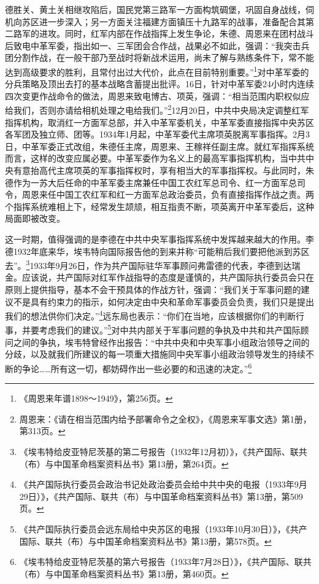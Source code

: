 德胜关、黄土关相继攻陷后，国民党第三路军一方面构筑碉堡，巩固自身战线，伺机向苏区进一步深入；另一方面关注福建方面镇压十九路军的战事，准备配合其第二路军的进攻。同时，红军内部在作战指挥上发生争论，朱德、周恩来在团村战斗后致电中革军委，指出如一、三军团会合作战，战果必不如此，强调：“我突击兵团分割作战，在一般干部乃至战时将新战术运用，尚未了解与熟练条件下，常不能达到高级要求的胜利，且常付出过大代价，此点在目前特别重要。”\footnote{《周恩来年谱1898～1949》，第256页。}对中革军委的分兵策略及顶出去打的基本战略含蓄提出批评。16日，针对中革军委24小时内连续四次变更作战命令的做法，周恩来致电博古、项英，强调：“相当范围内职权似应给我们，否则亦请给相机处理之电给我们。”\footnote{周恩来：《请在相当范围内给予部署命令之全权》，《周恩来军事文选》第1册，第313页。}12月20日，中共中央局决定调整红军指挥机构，取消红一方面军总部，并入中革军委机关，中革军委直接指挥中央苏区各军团及独立师、团等。1934年1月起，中革军委代主席项英脱离军事指挥。2月3日，中革军委正式改组，朱德任主席，周恩来、王稼祥任副主席。就红军指挥系统而言，这样的改变应属必要。中革军委作为名义上的最高军事指挥机构，当中共中央有意抬高代主席项英的军事指挥权时，享有相当大的军事指挥权。与此同时，朱德作为一苏大后任命的中革军委主席兼任中国工农红军总司令、红一方面军总司令，周恩来任中国工农红军和红一方面军总政治委员，负有直接指挥作战之责。两个指挥系统难相上下，经常发生颉颃，相互指责不断，项英离开中革军委后，这种局面即被改变。


这一时期，值得强调的是李德在中共中央军事指挥系统中发挥越来越大的作用。李德1932年底来华，埃韦特向国际报告他的到来并称“可能稍后我们要把他派到苏区去”。\footnote{《埃韦特给皮亚特尼茨基的第二号报告（1932年12月初）》，《共产国际、联共（布）与中国革命档案资料丛书》第13册，第264页。}1933年9月26日，作为共产国际驻华军事顾问弗雷德的代表，李德到达瑞金。应该说，共产国际对红军作战指导的态度是谨慎的，共产国际执行委员会只在原则上提供指导，基本不会干预具体的作战方针，强调：“我们关于军事问题的建议不是具有约束力的指示，如何决定由中央和革命军事委员会负责，我们只是提出我们的想法供你们决定。”\footnote{《共产国际执行委员会政治书记处政治委员会给中共中央的电报（1933年9月29日）》，《共产国际、联共（布）与中国革命档案资料丛书》第13册，第509页。}远东局也表示：“你们在当地，应该根据你们的判断行事，并要考虑我们的建议。”\footnote{《共产国际执行委员会远东局给中央苏区的电报（1933年10月30日）》，《共产国际、联共（布）与中国革命档案资料丛书》第13册，第578页。}对中共内部关于军事问题的争执及中共和共产国际顾问之间的争执，埃韦特曾经作出报告：“中共中央和中央军事小组政治领导之间的分歧，以及就我们所建议的每一项重大措施同中央军事小组政治领导发生的持续不断的争论……所有这一切，都妨碍作出一些必要的和迅速的决定。”\footnote{《埃韦特给皮亚特尼茨基的第六号报告（1933年7月28日）》，《共产国际、联共（布）与中国革命档案资料丛书》第13册，第460页。}


